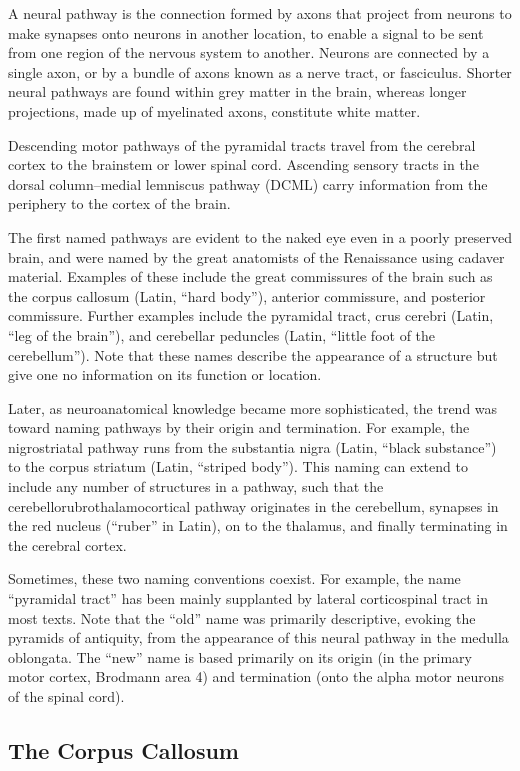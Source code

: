 A neural pathway is the connection formed by axons that project from neurons to make synapses onto neurons in another location, to enable a signal to be sent from one region of the nervous system to another. Neurons are connected by a single axon, or by a bundle of axons known as a nerve tract, or fasciculus. Shorter neural pathways are found within grey matter in the brain, whereas longer projections, made up of myelinated axons, constitute white matter.

Descending motor pathways of the pyramidal tracts travel from the cerebral cortex to the brainstem or lower spinal cord. Ascending sensory tracts in the dorsal column--medial lemniscus pathway (DCML) carry information from the periphery to the cortex of the brain.

The first named pathways are evident to the naked eye even in a poorly preserved brain, and were named by the great anatomists of the Renaissance using cadaver material. Examples of these include the great commissures of the brain such as the corpus callosum (Latin, ``hard body''), anterior commissure, and posterior commissure. Further examples include the pyramidal tract, crus cerebri (Latin, ``leg of the brain''), and cerebellar peduncles (Latin, ``little foot of the cerebellum''). Note that these names describe the appearance of a structure but give one no information on its function or location.

Later, as neuroanatomical knowledge became more sophisticated, the trend was toward naming pathways by their origin and termination. For example, the nigrostriatal pathway runs from the substantia nigra (Latin, ``black substance'') to the corpus striatum (Latin, ``striped body''). This naming can extend to include any number of structures in a pathway, such that the cerebellorubrothalamocortical pathway originates in the cerebellum, synapses in the red nucleus (``ruber'' in Latin), on to the thalamus, and finally terminating in the cerebral cortex.

Sometimes, these two naming conventions coexist. For example, the name ``pyramidal tract'' has been mainly supplanted by lateral corticospinal tract in most texts. Note that the ``old'' name was primarily descriptive, evoking the pyramids of antiquity, from the appearance of this neural pathway in the medulla oblongata. The ``new'' name is based primarily on its origin (in the primary motor cortex, Brodmann area 4) and termination (onto the alpha motor neurons of the spinal cord).

\hypertarget{the-corpus-callosum}{%
\subsection{The Corpus Callosum}\label{the-corpus-callosum}}

